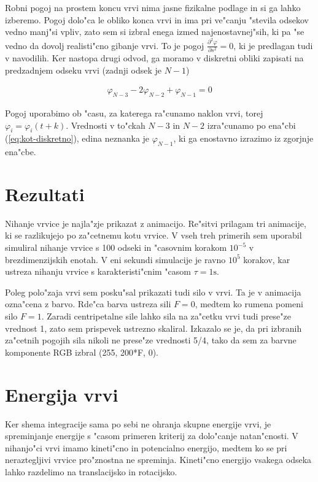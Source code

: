 \documentclass[a4paper,10pt]{article}
\renewcommand{\phi}{\varphi}
\newcommand{\parcdva}[2]{
  \frac{\partial^2 #1}{\partial #2 ^2}
}
\begin{document}
Robni pogoj na prostem koncu vrvi nima jasne fizikalne podlage in si ga lahko izberemo. Pogoj dolo"ca le obliko konca vrvi in ima pri ve"canju "stevila odsekov vedno manj"si vpliv, zato sem si izbral enega izmed najenostavnej"sih, ki pa "se vedno da dovolj realisti"cno gibanje vrvi. To je pogoj $\parcdva{\phi}{s}=0$, ki je predlagan tudi v navodilih. Ker nastopa drugi odvod, ga moramo v diskretni obliki zapisati na predzadnjem odseku vrvi (zadnji odsek je $N-1$)

\begin{align}
 \phi_{N-3} -2\phi_{N-2} + \phi_{N-1} = 0
\end{align}

Pogoj uporabimo ob "casu, za katerega ra"cunamo naklon vrvi, torej $\phi_i = \phi_i(t+k)$. Vrednosti v to"ckah $N-3$ in $N-2$ izra"cunamo po ena"cbi (\ref{eq:kot-diskretno}), edina neznanka je $\phi_{N-1}$, ki ga enostavno izrazimo iz zgorjnje ena"cbe. 

\section{Rezultati}

Nihanje vrvice je najla"zje prikazat z animacijo. Re"sitvi prilagam tri animacije, ki se razlikujejo po za"cetnemu kotu vrvice. V vseh treh primerih sem uporabil simuliral nihanje vrvice s 100 odseki in "casovnim korakom $10^{-5}$ v brezdimenzijskih enotah. V eni sekundi simulacije je ravno $10^5$ korakov, kar ustreza nihanju vrvice s karakteristi"cnim "casom $\tau = 1\mathrm{s}$. 

Poleg polo"zaja vrvi sem posku"sal prikazati tudi silo v vrvi. Ta je v animacija ozna"cena z barvo. Rde"ca barva ustreza sili $F=0$, medtem ko rumena pomeni silo $F=1$. Zaradi centripetalne sile lahko sila na za"cetku vrvi tudi prese"ze vrednost 1, zato sem prispevek ustrezno skaliral. Izkazalo se je, da pri izbranih za"cetnih pogojih sila nikoli ne prese"ze vrednosti 5/4, tako da sem za barvne komponente RGB izbral (255, 200*F, 0). 

\section{Energija vrvi}

Ker shema integracije sama po sebi ne ohranja skupne energije vrvi, je spreminjanje energije s "casom primeren kriterij za dolo"canje natan"cnosti. V nihanjo"ci vrvi imamo kineti"cno in potencialno energijo, medtem ko se pri neraztegljivi vrvice pro"znostna ne spreminja. Kineti"cno energijo vsakega odseka lahko razdelimo na translacijsko in rotacijsko. 
\end{document}
